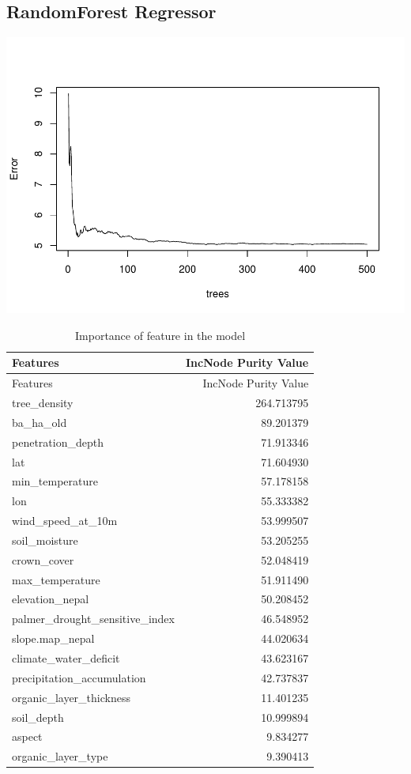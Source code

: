 \documentclass[
]{article}
\begin{document}
\hypertarget{randomforest-regressor}{%
\subsection{RandomForest Regressor}\label{randomforest-regressor}}

\includegraphics{feature_selection_report_files/figure-latex/unnamed-chunk-9-1.pdf}

\begin{longtable}[]{@{}lr@{}}
\caption{Importance of feature in the model}\tabularnewline
\toprule\noalign{}
Features & IncNode Purity Value \\
\midrule\noalign{}
\endfirsthead
\toprule\noalign{}
Features & IncNode Purity Value \\
\midrule\noalign{}
\endhead
\bottomrule\noalign{}
\endlastfoot
tree\_density & 264.713795 \\
ba\_ha\_old & 89.201379 \\
penetration\_depth & 71.913346 \\
lat & 71.604930 \\
min\_temperature & 57.178158 \\
lon & 55.333382 \\
wind\_speed\_at\_10m & 53.999507 \\
soil\_moisture & 53.205255 \\
crown\_cover & 52.048419 \\
max\_temperature & 51.911490 \\
elevation\_nepal & 50.208452 \\
palmer\_drought\_sensitive\_index & 46.548952 \\
slope.map\_nepal & 44.020634 \\
climate\_water\_deficit & 43.623167 \\
precipitation\_accumulation & 42.737837 \\
organic\_layer\_thickness & 11.401235 \\
soil\_depth & 10.999894 \\
aspect & 9.834277 \\
organic\_layer\_type & 9.390413 \\
\end{longtable}
\end{document}
